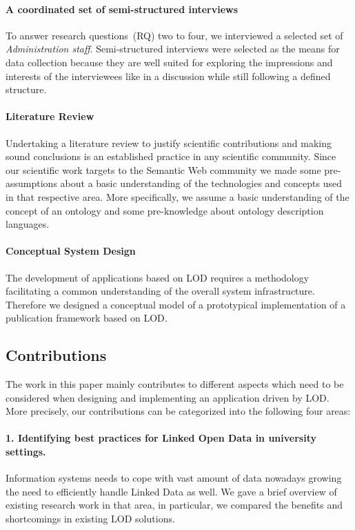 \documentclass{article}
\begin{document}
\paragraph{A coordinated set of semi-structured interviews}
To answer research questions~(RQ) two to four, we interviewed a selected set of \textit{Administration staff}. Semi-structured interviews were selected as the means for data collection because they are well suited for exploring the impressions and interests of the interviewees like in a discussion while still following a defined structure. 
\paragraph{Literature Review}
Undertaking a literature review to justify scientific contributions and making sound conclusions is an established practice in any scientific community. Since our scientific work targets to the Semantic Web community we made some pre-assumptions about a basic understanding of the technologies and concepts used in that respective area. More specifically, we assume a basic understanding of the concept of an ontology and some pre-knowledge about ontology description languages. 
\paragraph{Conceptual System Design}
The development of applications based on LOD requires a methodology facilitating a common understanding of the overall system infrastructure. Therefore we designed a conceptual model of a prototypical implementation of a publication framework based on LOD. 

\subsection{Contributions}
The work in this paper mainly contributes to different aspects which need to be considered when designing and implementing an application driven by LOD.
More precisely, our contributions can be categorized into the following four areas:
\paragraph{1. Identifying best practices for Linked Open Data in university settings.}
Information systems needs to cope with vast amount of data nowadays growing the need to efficiently handle Linked Data as well. We gave a brief overview of existing research work in that area, in particular, we compared the benefits and shortcomings in existing LOD solutions. 
\end{document}
